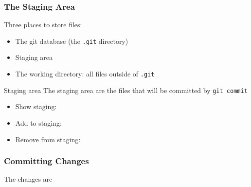 \begin{frame}
  \frametitle{The Staging Area}

  Three places to store files:
  \begin{itemize}
  \item The git database (the \texttt{.git} directory)
  \item Staging area
  \item The working directory: all files outside of \texttt{.git} 
  \end{itemize}

  \begin{block}{Staging area}
    The staging area are the files that will be committed by
    \texttt{git commit}
    \begin{itemize}
    \item Show staging: 
    \item Add to staging: 
    \item Remove from staging: 
    \end{itemize}
  \end{block}
\end{frame}




\begin{frame}
  \frametitle{Committing Changes}

  The changes are 
\end{frame}




